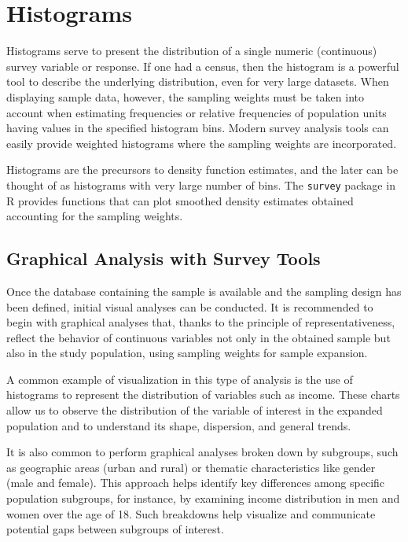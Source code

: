 \documentclass[
  12pt,
]{book}
\begin{document}
\hypertarget{histograms}{%
\section{Histograms}\label{histograms}}

Histograms serve to present the distribution of a single numeric (continuous) survey variable or response. If one had a census, then the histogram is a powerful tool to describe the underlying distribution, even for very large datasets. When displaying sample data, however, the sampling weights must be taken into account when estimating frequencies or relative frequencies of population units having values in the specified histogram bins. Modern survey analysis tools can easily provide weighted histograms where the sampling weights are incorporated.

Histograms are the precursors to density function estimates, and the later can be thought of as histograms with very large number of bins. The \texttt{survey} package in R provides functions that can plot smoothed density estimates obtained accounting for the sampling weights.

\hypertarget{graphical-analysis-with-survey-tools}{%
\subsection{Graphical Analysis with Survey Tools}\label{graphical-analysis-with-survey-tools}}

Once the database containing the sample is available and the sampling design has been defined, initial visual analyses can be conducted. It is recommended to begin with graphical analyses that, thanks to the principle of representativeness, reflect the behavior of continuous variables not only in the obtained sample but also in the study population, using sampling weights for sample expansion.

A common example of visualization in this type of analysis is the use of histograms to represent the distribution of variables such as income. These charts allow us to observe the distribution of the variable of interest in the expanded population and to understand its shape, dispersion, and general trends.

It is also common to perform graphical analyses broken down by subgroups, such as geographic areas (urban and rural) or thematic characteristics like gender (male and female). This approach helps identify key differences among specific population subgroups, for instance, by examining income distribution in men and women over the age of 18. Such breakdowns help visualize and communicate potential gaps between subgroups of interest.
\end{document}
